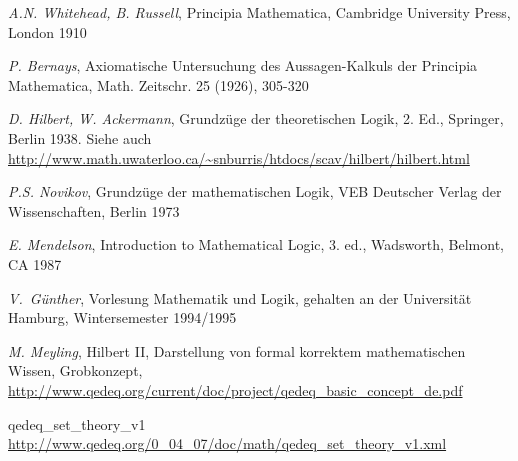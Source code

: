 \documentclass[a4paper,german,10pt,twoside]{book}
\theoremstyle{definition}
\theoremstyle{remark}
\begin{document}
\begin{thebibliography}{99}
 \emph{A.N. Whitehead, B. Russell}, Principia Mathematica, Cambridge University Press, London 1910

 \emph{P. Bernays}, Axiomatische Untersuchung des Aussagen-Kalkuls der {\glqq Principia Mathematica\grqq}, Math. Zeitschr. 25 (1926), 305-320

 \emph{D. Hilbert, W. Ackermann}, Grundz{\"u}ge der theoretischen Logik, 2. Ed., Springer, Berlin 1938. Siehe auch \url{http://www.math.uwaterloo.ca/~snburris/htdocs/scav/hilbert/hilbert.html}

 \emph{P.S. Novikov}, Grundz{\"u}ge der mathematischen Logik, VEB Deutscher Verlag der Wissenschaften, Berlin 1973

 \emph{E. Mendelson}, Introduction to Mathematical Logic, 3. ed., Wadsworth, Belmont, CA 1987

 \emph{V.~G{\"u}nther}, Vorlesung {\glqq Mathematik und Logik\grqq}, gehalten an der Universit{\"a}t Hamburg, Wintersemester 1994/1995

 \emph{M. Meyling}, Hilbert II, Darstellung von formal korrektem mathematischen Wissen, Grobkonzept, \url{http://www.qedeq.org/current/doc/project/qedeq_basic_concept_de.pdf}



 qedeq\_set\_theory\_v1 \url{http://www.qedeq.org/0_04_07/doc/math/qedeq_set_theory_v1.xml}


\end{thebibliography}
 \printindex
\end{document}
